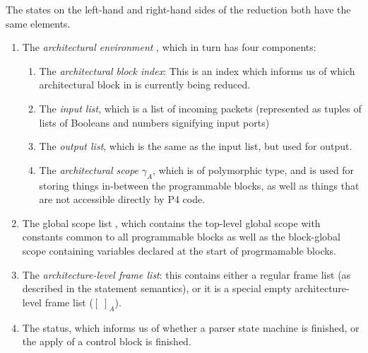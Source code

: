\documentclass[UTF8]{article}
\begin{document}
The states on the left-hand and right-hand sides of the reduction both have the same elements.
\begin{enumerate}
\item The \emph{architectural environment} \aenv{}, which in turn has four components:
\begin{enumerate}
\item The \emph{architectural block index}: This is an index which informs us of which architectural block in \abl{} is currently being reduced.
\item The \emph{input list}, which is a list of incoming packets (represented as tuples of lists of Booleans and numbers signifying input ports)
\item The \emph{output list}, which is the same as the input list, but used for output.
\item The \emph{architectural scope} $\gamma_A$, which is of polymorphic type, and is used for storing things in-between the programmable blocks, as well as things that are not accessible directly by P4 code.
\end{enumerate}
\item The global scope list \gscopel{}, which contains the top-level global scope with constants common to all programmable blocks as well as the block-global scope containing variables declared at the start of progrmamable blocks.
\item The \emph{architecture-level frame list}: this contains either a regular frame list (as described in the statement semantics), or it is a special empty architecture-level frame list ($[ \; ]_A$).
\item The status, which informs us of whether a parser state machine is finished, or the apply of a control block is finished.
\end{enumerate}
\end{document}
